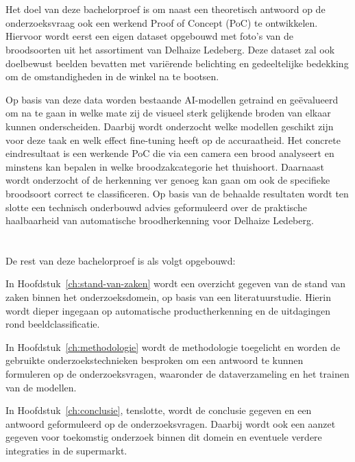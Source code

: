\section{}%
\label{sec:onderzoeksdoelstelling}

Het doel van deze bachelorproef is om naast een theoretisch antwoord op de onderzoeksvraag ook een werkend Proof of Concept (PoC) te ontwikkelen. Hiervoor wordt eerst een eigen dataset opgebouwd met foto's van de broodsoorten uit het assortiment van Delhaize Ledeberg. Deze dataset zal ook doelbewust beelden bevatten met variërende belichting en gedeeltelijke bedekking om de omstandigheden in de winkel na te bootsen.

Op basis van deze data worden bestaande AI-modellen getraind en geëvalueerd om na te gaan in welke mate zij de visueel sterk gelijkende broden van elkaar kunnen onderscheiden. Daarbij wordt onderzocht welke modellen geschikt zijn voor deze taak en welk effect fine-tuning heeft op de accuraatheid. Het concrete eindresultaat is een werkende PoC die via een camera een brood analyseert en minstens kan bepalen in welke broodzakcategorie het thuishoort. Daarnaast wordt onderzocht of de herkenning ver genoeg kan gaan om ook de specifieke broodsoort correct te classificeren. Op basis van de behaalde resultaten wordt ten slotte een technisch onderbouwd advies geformuleerd over de praktische haalbaarheid van automatische broodherkenning voor Delhaize Ledeberg.

\section{}%
\label{sec:opzet-bachelorproef}

De rest van deze bachelorproef is als volgt opgebouwd:

In Hoofdstuk~\ref{ch:stand-van-zaken} wordt een overzicht gegeven van de stand van zaken binnen het onderzoeksdomein, op basis van een literatuurstudie. Hierin wordt dieper ingegaan op automatische productherkenning en de uitdagingen rond beeldclassificatie.

In Hoofdstuk~\ref{ch:methodologie} wordt de methodologie toegelicht en worden de gebruikte onderzoekstechnieken besproken om een antwoord te kunnen formuleren op de onderzoeksvragen, waaronder de dataverzameling en het trainen van de modellen.

In Hoofdstuk~\ref{ch:conclusie}, tenslotte, wordt de conclusie gegeven en een antwoord geformuleerd op de onderzoeksvragen. Daarbij wordt ook een aanzet gegeven voor toekomstig onderzoek binnen dit domein en eventuele verdere integraties in de supermarkt.
